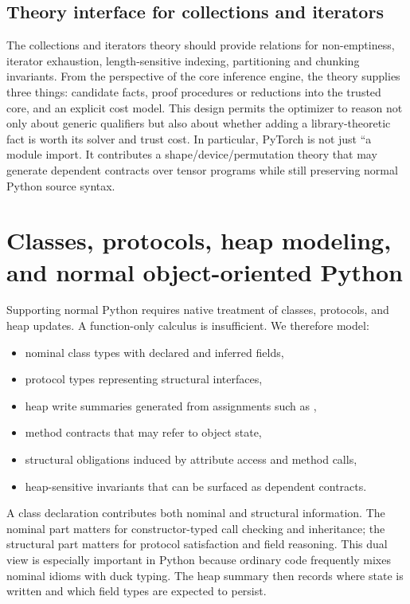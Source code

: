 \documentclass[11pt]{article}
\newcommand{\py}[1]{\texttt{\detokenize{#1}}}
\theoremstyle{definition}
\theoremstyle{plain}
\begin{document}
\subsection{Theory interface for collections and iterators}
The collections and iterators theory should provide relations for non-emptiness, iterator exhaustion, length-sensitive indexing, partitioning and chunking invariants. From the perspective of
the core inference engine, the theory supplies three things: candidate facts,
proof procedures or reductions into the trusted core, and an explicit cost model.
This design permits the optimizer to reason not only about generic qualifiers but
also about whether adding a library-theoretic fact is worth its solver and trust
cost. In particular, PyTorch is not just ``a module import. It contributes a
shape/device/permutation theory that may generate dependent contracts over tensor
programs while still preserving normal Python source syntax.



\section{Classes, protocols, heap modeling, and normal object-oriented Python}

Supporting normal Python requires native treatment of classes, protocols, and
heap updates. A function-only calculus is insufficient. We therefore model:
\begin{itemize}
  \item nominal class types with declared and inferred fields,
  \item protocol types representing structural interfaces,
  \item heap write summaries generated from assignments such as \py{self.x = e},
  \item method contracts that may refer to object state,
  \item structural obligations induced by attribute access and method calls,
  \item heap-sensitive invariants that can be surfaced as dependent contracts.
\end{itemize}

A class declaration contributes both nominal and structural information. The
nominal part matters for constructor-typed call checking and inheritance; the
structural part matters for protocol satisfaction and field reasoning. This dual
view is especially important in Python because ordinary code frequently mixes
nominal idioms with duck typing. The heap summary then records where state is
written and which field types are expected to persist.
\end{document}
